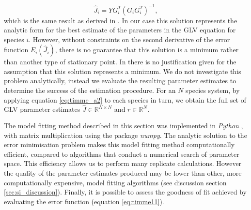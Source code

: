 \begin{equation}\label{eq:timme_a2}
\hat{J}_i = YG^T_i\left(G_iG^T_i\right)^{-1},
\end{equation}
%
which is the same result as derived in \cite{shandilya2011inferring}. In our case this solution represents the analytic form for the best estimate of the parameters in the GLV equation for species $i$. However, without constraints on the second derivative of the error function $E_i(\hat{J}_i)$, there is no guarantee that this solution is a minimum rather than another type of stationary point. In \cite{shandilya2011inferring} there is no justification given for the assumption that this solution represents a minimum. We do not investigate this problem analytically, instead we evaluate the resulting parameter estimates to determine the success of the estimation procedure. For an $N$ species system, by applying equation \eqref{eq:timme_a2} to each species in turn, we obtain the full set of GLV parameter estimates $\hat{J} \in \mathbb{R}^{N \times N}$ and $r \in \mathbb{R}^N$.

%

The model fitting method described in this section was implemented in \emph{Python} \cite{python}, with matrix multiplication using the package \emph{numpy}. The analytic solution to the error minimisation problem makes this model fitting method computationally efficient, compared to algorithms that conduct a numerical search of parameter space. This efficiency allows us to perform many replicate calculations. However the quality of the parameter estimates produced may be lower than other, more computationally expensive, model fitting algorithms (see discussion section \ref{sec:si_discussion}). Finally, it is possible to assess the goodness of fit achieved by evaluating the error function (equation \eqref{eq:timme11}). 


